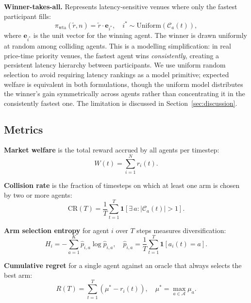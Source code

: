 \documentclass[11pt]{article}
\begin{document}
\textbf{Winner-takes-all.}
Represents latency-sensitive venues where only the fastest participant fills:
\begin{equation}
  \pi_{\text{wta}}(\tilde{r}, n) = \tilde{r} \cdot \mathbf{e}_{i^*},
  \quad i^* \sim \mathrm{Uniform}(\mathcal{C}_a(t)),
\end{equation}
where $\mathbf{e}_{i^*}$ is the unit vector for the winning agent.
The winner is drawn uniformly at random among colliding agents.
This is a modelling simplification: in real price-time priority venues,
the fastest agent wins \emph{consistently}, creating a persistent latency
hierarchy between participants.
We use uniform random selection to avoid requiring latency rankings as
a model primitive; expected welfare is equivalent in both formulations,
though the uniform model distributes the winner's gain symmetrically across
agents rather than concentrating it in the consistently fastest one.
The limitation is discussed in Section~\ref{sec:discussion}.

\subsection{Metrics}

\textbf{Market welfare} is the total reward accrued by all agents per
timestep:
\begin{equation}
  W(t) = \sum_{i=1}^{N} r_i(t).
\end{equation}

\textbf{Collision rate} is the fraction of timesteps on which at least
one arm is chosen by two or more agents:
\begin{equation}
  \text{CR}(T) = \frac{1}{T}\sum_{t=1}^{T} \mathbf{1}\!\left[\exists\, a :
    |\mathcal{C}_a(t)| > 1\right].
\end{equation}

\textbf{Arm selection entropy} for agent $i$ over $T$ steps measures
diversification:
\begin{equation}
  H_i = -\sum_{a=1}^{K} \hat{p}_{i,a} \log \hat{p}_{i,a},
  \quad \hat{p}_{i,a} = \frac{1}{T}\sum_{t=1}^{T}\mathbf{1}[a_i(t) = a].
\end{equation}

\textbf{Cumulative regret} for a single agent against an oracle that
always selects the best arm:
\begin{equation}
  R(T) = \sum_{t=1}^{T} \left(\mu^* - r_i(t)\right),
  \quad \mu^* = \max_{a \in \mathcal{A}} \mu_a.
\end{equation}
\end{document}
